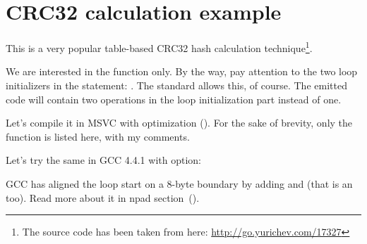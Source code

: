 \section{CRC32 calculation example}
\label{sec:CRC32}

\newcommand{\URLCRCSRC}{\url{http://go.yurichev.com/17327}}

This is a very popular table-based CRC32 hash calculation 
technique\footnote{The source code has been taken from here: \URLCRCSRC}.




We are interested in the  function only.
By the way, pay attention to the two loop initializers in the  statement: .
The \CCpp standard allows this, of course.
The emitted code will contain two operations in the loop initialization part
instead of one.

Let's compile it in MSVC with optimization (\Ox).
For the sake of brevity, only the  function is listed here, with my comments.



Let's try the same in GCC 4.4.1 with \Othree option:




GCC has aligned the loop start on a 8-byte boundary by adding \NOP and 
(that is an  too).
Read more about it in npad section~().

